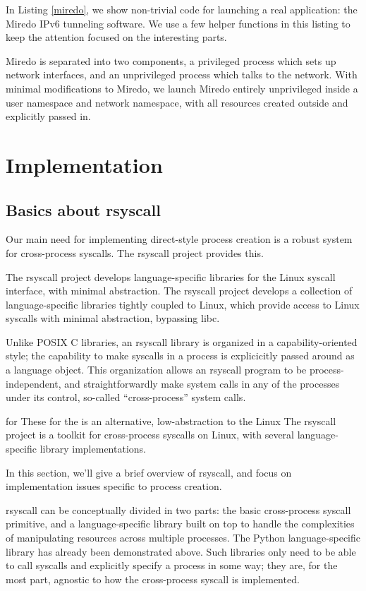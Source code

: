 \documentclass{acmart}
\begin{document}
In Listing \ref{miredo},
we show non-trivial code for launching a real application:
the Miredo IPv6 tunneling software.
We use a few helper functions in this listing to keep the attention focused on the interesting parts.

Miredo is separated into two components, a privileged process which sets up network interfaces,
and an unprivileged process which talks to the network.
With minimal modifications to Miredo,
we launch Miredo entirely unprivileged inside a user namespace and network namespace,
with all resources created outside and explicitly passed in.
\section{Implementation}\label{implementation}
\subsection{Basics about rsyscall}
Our main need for implementing direct-style process creation
is a robust system for cross-process syscalls.
The rsyscall project provides this.

The rsyscall project develops language-specific libraries
for the Linux syscall interface, with minimal abstraction.
The rsyscall project develops a collection of language-specific libraries tightly coupled to Linux,
which provide access to Linux syscalls with minimal abstraction,
bypassing libc.

Unlike POSIX C libraries, an rsyscall library is organized in a capability-oriented style;
the capability to make syscalls in a process is explicicitly passed around as a language object.
This organization allows an rsyscall program to be process-independent,
and straightforwardly make system calls in any of the processes under its control,
so-called ``cross-process'' system calls.

for 
These 
for the is an alternative, low-abstraction to the Linux
The rsyscall project is a toolkit for cross-process syscalls on Linux,
with several language-specific library implementations.

In this section, we'll give a brief overview of rsyscall,
and focus on implementation issues specific to process creation.

rsyscall can be conceptually divided in two parts:
the basic cross-process syscall primitive,
and a language-specific library built on top
to handle the complexities of manipulating resources across multiple processes.
The Python language-specific library has already been demonstrated above.
Such libraries only need to be able to call syscalls and explicitly specify a process in some way;
they are, for the most part, agnostic to how the cross-process syscall is implemented.
\end{document}
